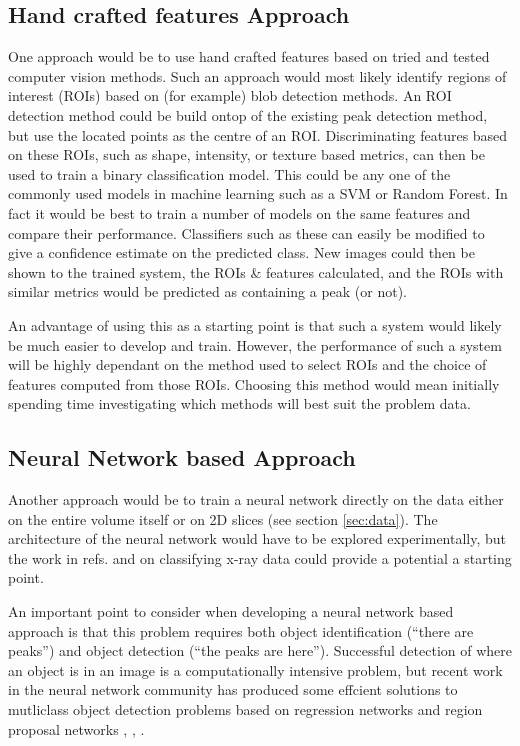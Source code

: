 \documentclass[paper=a4, fontsize=8pt]{scrartcl} \usepackage[T1]{fontenc}
\begin{document}
\subsection{Hand crafted features Approach}
One approach would be to use hand crafted features based on tried and tested
computer vision methods. Such an approach would most likely identify regions of
interest (ROIs) based on (for example) blob detection methods. An ROI detection
method could be build ontop of the existing peak detection method, but use the 
located points as the centre of an ROI. Discriminating 
features based on these ROIs, such as shape, intensity, or texture based metrics, 
can then be used to train a binary classification model. This could be any one of the 
commonly used models in machine learning such as a SVM or Random Forest. In fact 
it would be best to train a number of models on the same features and 
compare their performance. Classifiers such as these can easily be modified to 
give a confidence estimate on the predicted class. New images could then be 
shown to the trained system, the ROIs \& features calculated, and the ROIs with 
similar metrics would be predicted as containing a peak (or not).

An advantage of using this as a starting point is that such a system would
likely be much easier to develop and train. However, the performance of such a
system will be highly dependant on the method used to select ROIs and the choice of
features computed from those ROIs. Choosing this method would mean initially 
spending time investigating which methods will best suit the problem data.

\subsection{Neural Network based Approach}
Another approach would be to train a neural network directly on the data either
on the entire volume itself or on 2D slices (see section \ref{sec:data}). The 
architecture of the neural network would have to be explored experimentally, but 
the work in refs. \cite{wang2016x} and \cite{kiapour2014materials} on 
classifying x-ray data could provide a potential a starting point. 

An important point to consider when developing a neural network based approach is that this 
problem requires both object identification (``there are peaks'') and object 
detection (``the peaks are here''). Successful detection of where an object
is in an image is a computationally intensive problem, but recent work in the 
neural network community has produced some effcient solutions to mutliclass object detection problems
based on regression networks \cite{sermanet2013overfeat} and region proposal 
networks \cite{kiapour2014materials}, \cite{girshick2014rich}, \cite{renNIPS15fasterrcnn}.
\end{document}

